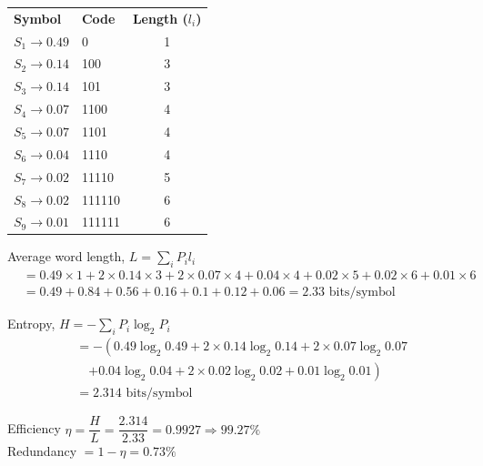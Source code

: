 \documentclass[12pt]{article}
\begin{document}
\begin{table}[ht]
	\centering
	\renewcommand{\arraystretch}{1.2}
	\begin{tabular}{l l c}
		\rowcolor{black!10}
		\textbf{Symbol}        & \textbf{Code} & \textbf{Length ($l_i$)} \\
		$S_1 \rightarrow 0.49$ & 0             & 1                       \\
		$S_2 \rightarrow 0.14$ & 100           & 3                       \\
		$S_3 \rightarrow 0.14$ & 101           & 3                       \\
		$S_4 \rightarrow 0.07$ & 1100          & 4                       \\
		$S_5 \rightarrow 0.07$ & 1101          & 4                       \\
		$S_6 \rightarrow 0.04$ & 1110          & 4                       \\
		$S_7 \rightarrow 0.02$ & 11110         & 5                       \\
		$S_8 \rightarrow 0.02$ & 111110        & 6                       \\
		$S_9 \rightarrow 0.01$ & 111111        & 6                       \\
	\end{tabular}
\end{table}

Average word length, $L = \sum_i P_i l_i$
\begin{align*}
	 & = 0.49 \times 1 + 2 \times 0.14 \times 3 + 2 \times 0.07 \times 4 + 0.04 \times 4 + 0.02 \times 5 + 0.02 \times 6 + 0.01 \times 6 \\
	 & = 0.49 + 0.84 + 0.56 + 0.16 + 0.1 + 0.12 + 0.06 = 2.33 \text{ bits/symbol}
\end{align*}

Entropy, $H = -\sum_i P_i \log_2 P_i$
\begin{align*}
	 & = -\left( 0.49 \log_2 0.49 + 2 \times 0.14 \log_2 0.14 + 2 \times 0.07 \log_2 0.07 \right. \\
	 & \quad \left. + 0.04 \log_2 0.04 + 2 \times 0.02 \log_2 0.02 + 0.01 \log_2 0.01 \right)     \\
	 & = 2.314 \text{ bits/symbol}
\end{align*}

Efficiency $\eta = \dfrac{H}{L} = \dfrac{2.314}{2.33} = 0.9927 \Rightarrow 99.27\%$ \\

Redundancy $= 1 - \eta = 0.73\%$
\end{document}
